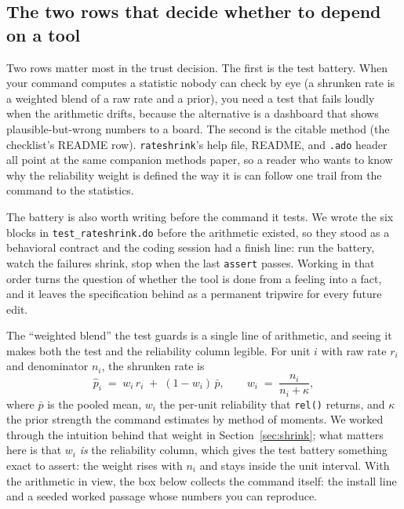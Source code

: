 \documentclass[
    a4paper,
    fontsize=10pt,
    twoside=true,
    numbers=noenddot,
]{kaobook}
\begin{document}
\subsection{The two rows that decide whether to depend on a tool}\label{sec:ch15-trust-rows}
Two rows matter most in the trust decision. The first is the test battery. When your command computes a statistic nobody can check by eye (a shrunken rate is a weighted blend of a raw rate and a prior), you need a test that fails loudly when the arithmetic drifts, because the alternative is a dashboard that shows plausible-but-wrong numbers to a board. The second is the citable method (the checklist's README row). \texttt{rateshrink}'s help file, README, and \texttt{.ado} header all point at the same companion methods paper, so a reader who wants to know why the reliability weight is defined the way it is can follow one trail from the command to the statistics.

The battery is also worth writing before the command it tests. We wrote the six blocks in \texttt{test\_rateshrink.do} before the arithmetic existed, so they stood as a behavioral contract and the coding session had a finish line: run the battery, watch the failures shrink, stop when the last \texttt{assert} passes. Working in that order turns the question of whether the tool is done from a feeling into a fact, and it leaves the specification behind as a permanent tripwire for every future edit.

The \enquote{weighted blend} the test guards is a single line of arithmetic, and seeing it makes both the test and the reliability column legible. For unit $i$ with raw rate $r_i$ and denominator $n_i$, the shrunken rate is
\[
  \hat{p}_i \;=\; w_i\,r_i \;+\; (1-w_i)\,\bar{p},
  \qquad
  w_i \;=\; \frac{n_i}{n_i + \kappa},
\]
where $\bar p$ is the pooled mean, $w_i$ the per-unit reliability that \texttt{rel()} returns, and $\kappa$ the prior strength the command estimates by method of moments. We worked through the intuition behind that weight in Section~\ref{sec:shrink}; what matters here is that $w_i$ \emph{is} the reliability column, which gives the test battery something exact to assert: the weight rises with $n_i$ and stays inside the unit interval. With the arithmetic in view, the box below collects the command itself: the install line and a seeded worked passage whose numbers you can reproduce.
\end{document}
